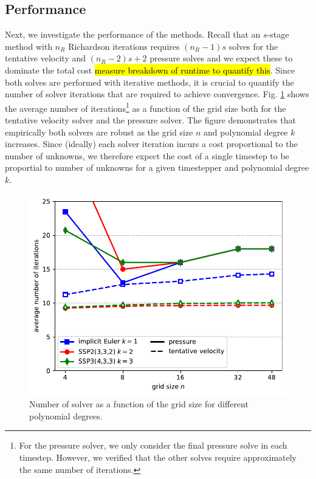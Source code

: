 \documentclass[11pt]{article}
\begin{document}
\subsection{Performance}
Next, we investigate the performance of the methods. Recall that an $s$-stage method with $n_R$ Richardson iterations requires $(n_R-1)s$ solves for the tentative velocity and $(n_R-2)s+2$ pressure solves and we expect these to dominate the total cost \hl{measure breakdown of runtime to quantify this}. Since both solves are performed with iterative methods, it is crucial to quantify the number of solver iterations that are required to achieve convergence. Fig. \ref{fig:niter} shows the average number of iterations\footnote{For the pressure solver, we only consider the final pressure solve in each timestep. However, we verified that the other solves require approximately the same number of iterations.} as a function of the grid size both for the tentative velocity solver and the pressure solver. The figure demonstrates that empirically both solvers are robust as the grid size $n$ and polynomial degree $k$ increases. Since (ideally) each solver iteration incurs a cost proportional to the number of unknowns, we therefore expect the cost of a single timestep to be proportial to number of unknowns for a given timestepper and polynomial degree $k$.
\begin{figure}
    \begin{center}
        \includegraphics[width=0.75\linewidth]{figures/niter.pdf}
        \caption{Number of solver as a function of the grid size for different polynomial degrees.}
        \label{fig:niter}
    \end{center}
\end{figure}
\end{document}

